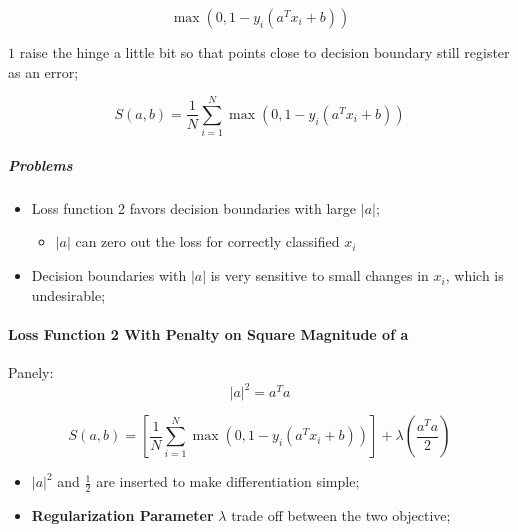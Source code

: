       \begin{equation}
        \max\left( 0, 1 - y_{i} \left( a^{T} x_{i} + b \right) \right)
      \end{equation}
      
      $ 1 $ raise the hinge a little bit so that points close to decision boundary still register as an error;
      
      \begin{equation}
        S\left( a, b \right) = \frac{1}{N} \sum_{i = 1}^{N} \max\left( 0, 1 - y_{i} \left( a^{T} x_{i} + b \right) \right)
      \end{equation}
      
      \subparagraph{Problems}
      \begin{itemize}
        \item Loss function 2 favors decision boundaries with large $ \left| a \right| $;
        \begin{itemize}
          \item $ \left| a \right| $ can zero out the loss for correctly classified $ x_{i} $ 
        \end{itemize}
        
        \item Decision boundaries with $ \left| a \right| $ is very sensitive to small changes in $ x_{i} $, which is undesirable;
      \end{itemize}
      
      \paragraph{Loss Function 2 With Penalty on Square Magnitude of a}
      
      Panely:
      \begin{equation}
        \left| a \right|^{2} = a^{T} a
      \end{equation}
      
      \begin{equation}
        S\left( a, b \right) = \left[ \frac{1}{N} \sum_{i = 1}^{N} \max\left( 0, 1 - y_{i} \left( a^{T} x_{i} + b \right) \right)  \right] + \lambda \left( \frac{ a^{T} a }{ 2 } \right)
      \end{equation}
      
      \begin{itemize}
        \item $ \left| a \right|^{2} $ and $ \frac{1}{2} $ are inserted to make differentiation simple;
        \item \textbf{Regularization Parameter} $ \lambda $ trade off between the two objective;
      \end{itemize}
      
